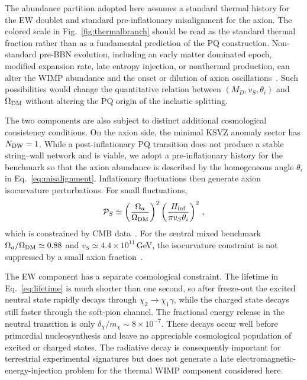 \documentclass[aps,prd,reprint,preprintnumbers,superscriptaddress,nofootinbib,floatfix]{revtex4-2}
\newcommand{\dchi}{\delta_\chi}
\begin{document}
The abundance partition adopted here assumes a standard thermal history for the EW doublet and standard pre-inflationary misalignment for the axion. The colored scale in Fig.~\ref{fig:thermalbranch} should be read as the standard thermal fraction rather than as a fundamental prediction of the PQ construction. Non-standard pre-BBN evolution, including an early matter dominated epoch, modified expansion rate, late entropy injection, or nonthermal production, can alter the WIMP abundance and the onset or dilution of axion oscillations~\cite{Visinelli:2009kt,Arias:2012az,Marsh:2015xka}. Such possibilities would change the quantitative relation between $(M_D,v_S,\theta_i)$ and $\Omega_{\rm DM}$ without altering the PQ origin of the inelastic splitting.

The two components are also subject to distinct additional cosmological consistency conditions. On the axion side, the minimal KSVZ anomaly sector has $N_{\rm DW}=1$. While a post-inflationary PQ transition does not produce a stable string--wall network and is viable, we adopt a pre-inflationary history for the benchmark so that the axion abundance is described by the homogeneous angle $\theta_i$ in Eq.~\eqref{eq:misalignment}. Inflationary fluctuations then generate axion isocurvature perturbations. For small fluctuations,
\begin{equation}
    \label{eq:isocurvature}
    \mathcal P_S\simeq \left(\frac{\Omega_a}{\Omega_{\rm DM}}\right)^2\left(\frac{H_{\rm inf}}{\pi v_S\theta_i}\right)^2\,,
\end{equation}
which is constrained by CMB data~\cite{Planck:2018jri}. For the central mixed benchmark $\Omega_a/\Omega_{\rm DM}\simeq0.88$ and $v_S\simeq4.4\times10^{11}$\,GeV, the isocurvature constraint is not suppressed by a small axion fraction~\cite{Marsh:2015xka, DiLuzio:2020wdo}.

The EW component has a separate cosmological constraint. The lifetime in Eq.~\eqref{eq:lifetime} is much shorter than one second, so after freeze-out the excited neutral state rapidly decays through $\chi_2\to\chi_1\gamma$, while the charged state decays still faster through the soft-pion channel. The fractional energy release in the neutral transition is only $\dchi/m_\chi\sim8\times10^{-7}$. These decays occur well before primordial nucleosynthesis and leave no appreciable cosmological population of excited or charged states. The radiative decay is consequently important for terrestrial experimental signatures but does not generate a late electromagnetic-energy-injection problem for the thermal WIMP component considered here.
\end{document}
